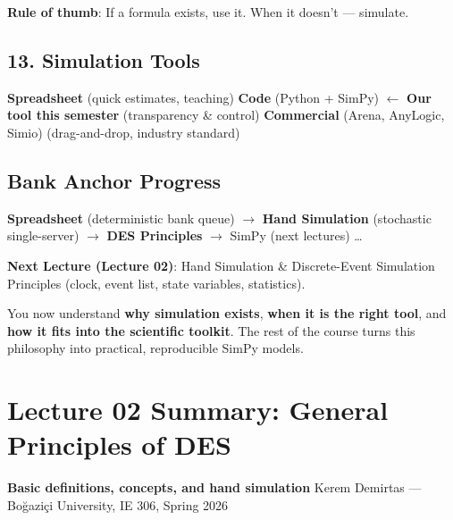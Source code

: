 \documentclass[11pt]{article}
\begin{document}
\textbf{Rule of thumb}: If a formula exists, use it. When it doesn't --- simulate.

\subsection*{13. Simulation Tools}
\textbf{Spreadsheet} (quick estimates, teaching)  
\textbf{Code} (Python + SimPy) $\leftarrow$ \textbf{Our tool this semester} (transparency \& control)  
\textbf{Commercial} (Arena, AnyLogic, Simio) (drag-and-drop, industry standard)

\subsection*{Bank Anchor Progress}
\textbf{Spreadsheet} (deterministic bank queue) $\rightarrow$ \textbf{Hand Simulation} (stochastic single-server) $\rightarrow$ \textbf{DES Principles} $\rightarrow$ SimPy (next lectures) \ldots{}

\textbf{Next Lecture (Lecture 02)}: Hand Simulation \& Discrete-Event Simulation Principles (clock, event list, state variables, statistics).

You now understand \textbf{why simulation exists}, \textbf{when it is the right tool}, and \textbf{how it fits into the scientific toolkit}. The rest of the course turns this philosophy into practical, reproducible SimPy models.

\section*{Lecture 02 Summary: General Principles of DES}
\textbf{Basic definitions, concepts, and hand simulation}
Kerem Demirtas --- Boğaziçi University, IE 306, Spring 2026
\end{document}

